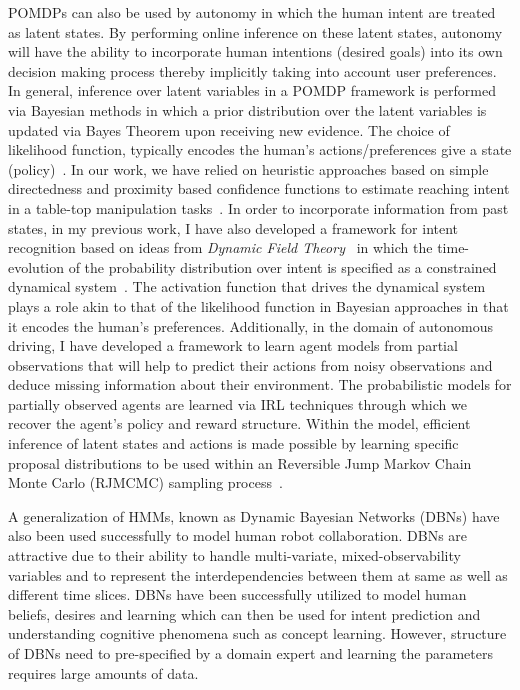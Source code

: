 \documentclass[12pt]{article}
\begin{document}
POMDPs can also be used by autonomy in which the human intent are treated as latent states. By performing online inference on these latent states, autonomy will have the ability to incorporate human intentions (desired goals) into its own decision making process thereby implicitly taking into account user preferences. In general, inference over latent variables in a POMDP framework is performed via Bayesian methods in which a prior distribution over the latent variables is updated via Bayes Theorem upon receiving new evidence. The choice of likelihood function, typically encodes the human's actions/preferences give a state (policy)~\cite{dragan2012formalizing}. In our work, we have relied on heuristic approaches based on simple directedness and proximity based confidence functions to estimate reaching intent in a table-top manipulation tasks~\cite{gopinath2017human}. In order to incorporate information from past states, in my previous work, I have also developed a framework for intent recognition based on ideas from \textit{Dynamic Field Theory}~\cite{schoner1995dynamics} in which the time-evolution of the probability distribution over intent is specified as a constrained dynamical system~\cite{gopinathdynamic}. The activation function that drives the dynamical system plays a role akin to that of the likelihood function in Bayesian approaches in that it encodes the human's preferences. Additionally, in the domain of autonomous driving, I have developed a framework to learn agent models from partial observations that will help to predict their actions from noisy observations and deduce missing information about their environment. The probabilistic models for partially observed agents are learned via IRL techniques through which we recover the agent's policy and reward structure. Within the model, efficient inference of latent states and actions is made possible by learning specific proposal distributions\cite{gu2015neural} to be used within an Reversible Jump Markov Chain Monte Carlo (RJMCMC) sampling process~\cite{green1995reversible}. 

A generalization of HMMs, known as Dynamic Bayesian Networks (DBNs) have also been used successfully to model human robot collaboration. DBNs are attractive due to their ability to handle multi-variate, mixed-observability variables and to represent the interdependencies between them at same as well as different time slices\cite{murphy2002dynamic}. DBNs have been successfully utilized to model human beliefs, desires and learning which can then be used for intent prediction and understanding cognitive phenomena such as concept learning\cite{tahboub2006intelligent}. However, structure of DBNs need to pre-specified by a domain expert and learning the parameters requires large amounts of data. 
\end{document}
